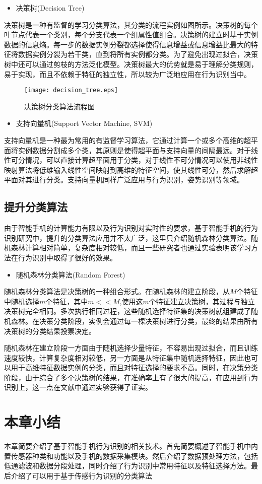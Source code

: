 \begin{itemize}
	\item 决策树(Decision Tree)
\end{itemize}
\par 决策树是一种有监督的学习分类算法，其分类的流程实例如图所示。决策树的每个叶节点代表一个类别，每个分支代表一个组属性值组合。决策树的建立时基于实例数据的信息熵。每一步的数据实例分裂都选择使得信息增益或信息增益比最大的特征将数据实例分裂为若干类，直到将所有实例都分类。为了避免出现过拟合，决策树中还可以通过剪枝的方法泛化模型。决策树最大的优势就是易于理解分类规则，易于实现，而且不依赖于特征的独立性，所以较为广泛地应用在行为识别当中。
\begin{figure}[ht]
\centering
\texttt{[image: decision\_tree.eps]}
\caption{决策树分类算法流程图}
\end{figure}
\begin{itemize}
	\item 支持向量机(Support Vector Machine, SVM)
\end{itemize}
\par 支持向量机是一种最为常用的有监督学习算法，它通过计算一个或多个高维的超平面将实例数据分割成多个类，其原则是使得超平面与支持向量的间隔最远。对于线性可分情况，可以直接计算超平面用于分类，对于线性不可分情况可以使用非线性映射算法将低维输入线性空间映射到高维的特征空间，使其线性可分，然后求解超平面对其进行分类。支持向量机同样广泛应用与行为识别，姿势识别等领域。

\subsection{提升分类算法}
\par 由于智能手机的计算能力有限以及行为识别对实时性的要求，基于智能手机的行为识别研究中，提升的分类算法应用并不太广泛，这里只介绍随机森林分类算法。随机森林计算相对简单，复杂度相对较低，而且一些研究者也通过实验表明该学习方法在行为识别中取得了很好的效果。
\begin{itemize}
	\item 随机森林分类算法(Random Forest)
\end{itemize}
\par 随机森林分类算法是决策树的一种组合形式。在随机森林的建立阶段，从$M$个特征中随机选择$m$个特征，其中$m<<M$,使用这$m$个特征建立决策树，其过程与独立决策树完全相同。多次执行相同过程，这些随机选择特征集的决策树就组建成了随机森林。在决策分类阶段，实例会通过每一棵决策树进行分类，最终的结果由所有决策树的分类结果投票决定。
\par 随机森林在建立阶段一方面由于随机选择少量特征，不容易出现过拟合，而且训练速度较快，计算复杂度相对较低，另一方面是从特征集中随机选择特征，因此也可以用于高维特征数据实例的分类，而且对特征选择的要求不高。同时，在决策分类阶段，由于综合了多个决策树的结果，在准确率上有了很大的提高，在应用到行为识别上，这一点在文献中通过实验获得了证实。

\section{本章小结}
\par 本章简要介绍了基于智能手机行为识别的相关技术。首先简要概述了智能手机中内置传感器种类和功能以及手机的数据采集模块。然后介绍了数据预处理方法，包括低通滤波和数据分段处理，同时介绍了行为识别中常用特征以及特征选择方法。最后介绍了可以用于基于传感行为识别的分类算法